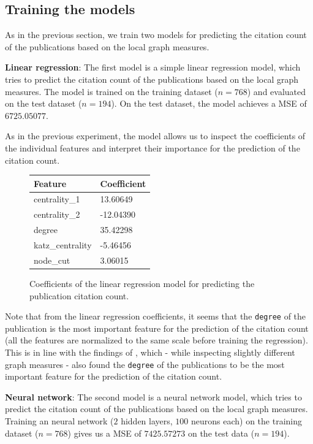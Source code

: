 \subsection{Training the models}

As in the previous section, we train two models for predicting the citation count of the publications based on the local graph measures.

\textbf{Linear regression}: The first model is a simple linear regression model, which tries to predict the citation count of the publications based on the local graph measures.
The model is trained on the training dataset ($n=768$) and evaluated on the test dataset ($n=194$). 
On the test dataset, the model achieves a \ac{MSE} of $6725.05077$.

As in the previous experiment, the model allows us to inspect the coefficients of the individual features and interpret their importance for the prediction of the citation count.

\begin{figure}[!ht]
    \captionsetup{width=.9\linewidth}
    \centering
    \begin{tabular}{|l|l|}
    \hline
        \textbf{Feature} & \textbf{Coefficient} \\ \hline
        centrality\_1 & 13.60649 \\ \hline
        centrality\_2 & -12.04390 \\ \hline
        degree & 35.42298 \\ \hline
        katz\_centrality & -5.46456 \\ \hline
        node\_cut & 3.06015 \\ \hline
    \end{tabular}
    \caption{Coefficients of the linear regression model for predicting the publication citation count.}
\end{figure}

Note that from the linear regression coefficients, it seems that the \texttt{degree} of the publication is the most important feature for the prediction of the citation count (all the features are normalized to the same scale before training the regression).
This is in line with the findings of \cite{ABBASI2011594}, which - while inspecting slightly different graph measures - also found the \texttt{degree} of the publications to be the most important feature for the prediction of the citation count.

\textbf{Neural network}: The second model is a neural network model, which tries to predict the citation count of the publications based on the local graph measures.
Training an neural network ($2$ hidden layers, $100$ neurons each) on the training dataset ($n=768$) gives us a \ac{MSE} of $7425.57273$ on the test data ($n=194$).

